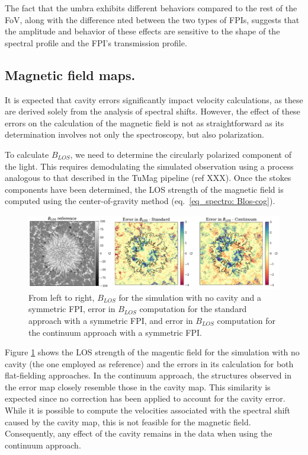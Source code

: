 The fact that the umbra exhibits different behaviors compared to the rest of the FoV, along with the difference nted between the two types of FPIs, suggests that the amplitude and behavior of these effects are sensitive to the shape of the spectral profile and the FPI's transmission profile. 

\subsection{Magnetic field maps.}

It is expected that cavity errors significantly impact velocity calculations, as these are derived solely from the analysis of spectral shifts. However, the effect of these errors on the calculation of the magnetic field is not as straightforward as its determination involves not only the spectroscopy, but also polarization. 

To calculate $B_{LOS}$, we need to determine the circularly polarized component of the light. This requires demodulating the simulated observation using a process analogous to that described in the TuMag pipeline (ref XXX). Once the stokes components have been determined, the LOS strength of the magnetic field is computed using the center-of-gravity method  (eq.~\eqref{eq_spectro: Blos-cog}). 

\begin{figure}
  \includegraphics[width=\textwidth]{figures/Mancha/blos_errors.pdf}
  \caption{
    From left to right, $B_{LOS}$ for the simulation with no cavity and a symmetric FPI, error in $B_{LOS}$ computation for the standard approach with a symmetric FPI, and error in $B_{LOS}$ computation for the continuum approach with a symmetric FPI. 
    \label{fig_mancha: blos_errors}}
\end{figure}

Figure \ref{fig_mancha: blos_errors} shows the LOS strength of the magentic field for the simulation with no cavity (the one employed as reference) and the errors in its calculation for both flat-fielding approaches.  In the continuum approach, the structures observed in the error map closely resemble those in the cavity map. This similarity is expected since no correction has been applied to account for the cavity error. While it is possible to compute the velocities associated with the spectral shift caused by the cavity map, this is not feasible for the magnetic field. Consequently, any effect of the cavity remains in the data when using the continuum approach.

